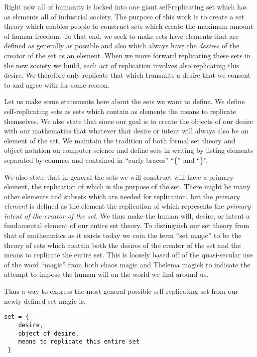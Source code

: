Right now all of humanity is locked into one giant self-replicating set
which has as elements all of industrial society. The purpose of this
work is to create a set theory which enables people to construct sets
which create the maximum amount of human freedom. To that end, we seek
to make sets have elements that are defined as generally as possible and
also which always have the \emph{desires} of the creator of the set as
an element. When we move forward replicating these sets in the new
society we build, each act of replication involves also replicating this
desire. We therefore only replicate that which transmits a desire that
we consent to and agree with for some reason.

Let us make some statements here about the sets we want to define. We
define self-replicating sets as sets which contain as elements the means
to replicate themselves. We also state that since our goal is to create
the objects of our desire with our mathematics that whatever that desire
or intent will always also be an element of the set. We maintain the
tradition of both formal set theory and object notation on computer
science and define sets in writing by listing elements separated by
commas and contained in ``curly braces'' ``\{'' and ``\}''.

We also state that in general the sets we will construct will have a
primary element, the replication of which is the purpose of the set.
There might be many other elements and subsets which are needed for
replication, but the \emph{primary element} is defined as the element
the replication of which represents the \emph{primary intent of the
creator of the set}. We thus make the human will, desire, or intent a
fundamental element of our entire set theory. To distinguish our set
theory from that of mathematics as it exists today we coin the term
``set magic'' to be the theory of sets which contain both the desires of
the creator of the set and the means to replicate the entire set. This
is loosely based off of the quasi-secular use of the word ``magic'' from
both chaos magic and Thelema magick to indicate the attempt to impose
the human will on the world we find around us.

Thus a way to express the most general possible self-replicating set
from our newly defined set magic is:

\begin{verbatim}
set = {
    desire,
    object of desire,
    means to replicate this entire set
 }
\end{verbatim}

